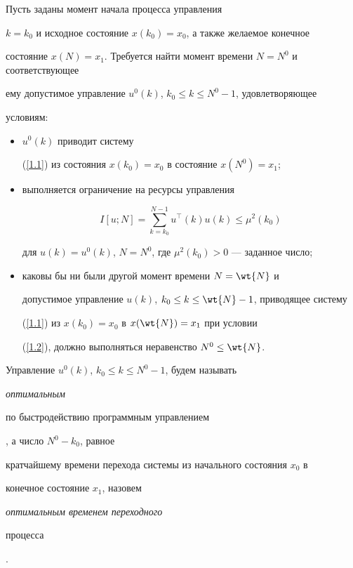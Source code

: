 \begin{probs}


Пусть заданы момент начала процесса управления


$k=k_{0}$ и исходное состояние $x(k_{0})=x_{0}$, а также желаемое конечное


состояние $x(N)=x_1$. Требуется найти момент времени $N=N^0$ и соответствующее


ему допустимое управление $u^0(k)$, $k_0\le k\le N^0-1$, удовлетворяющее


условиям:


\begin{itemize}


\item[1)] $u^0(k)$ приводит систему


(\ref{1.1}) из состояния $x(k_0)=x_0$ в состояние $x(N^0)=x_1$;


\item[2)] выполняется ограничение на ресурсы управления


\begin{equation}\label{1.2}


I[u; N] = \sum_{k=k_0}^{N-1} u^{\top}(k) 


u(k)\le \mu^2(k_0)


\end{equation}


для $u(k)=u^0(k)$, $N=N^0$, где $\mu^2(k_0)> 0$ --- заданное число;


\item[3)] каковы бы ни были другой момент времени $N=\wt{N}$ и


допустимое управление $u(k)$, $k_0\le k \le \wt{N}-1$, приводящее систему


(\ref{1.1}) из $x(k_0)=x_0$ в $x(\wt{N})=x_1$ при условии


(\ref{1.2}), должно выполняться неравенство $N^0\le \wt{N}$.


\end{itemize}


\end{probs}





Управление $u^0(k)$, $k_0\le k \le N^0-1$, будем называть {\it оптимальным


по быстродействию программным управлением}, а число $ N^0-k_0$, равное


кратчайшему времени перехода системы из начального состояния $x_0$ в


конечное состояние $x_1$, назовем {\it оптимальным временем переходного


процесса}.\vspace{2mm}





